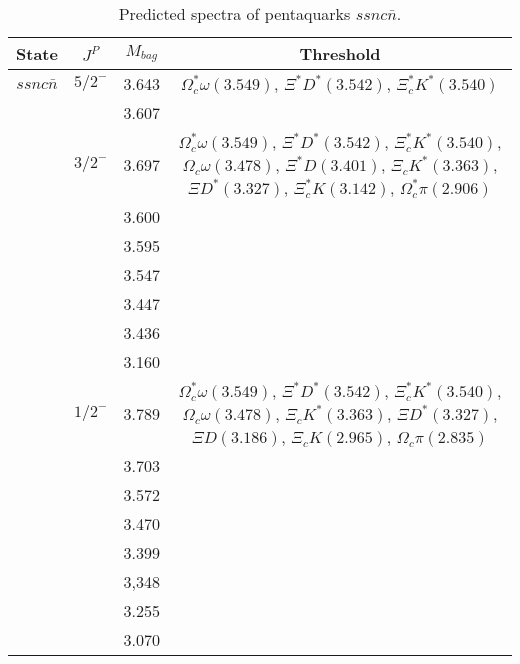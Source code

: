 \documentclass[prd,twocolumn,floatfix,nofootinbib]{revtex4}
\begin{document}
\renewcommand{\tabcolsep}{0.3cm}
\renewcommand{\arraystretch}{1.2}
\begin{table*}[!htbp]
    \caption{Predicted spectra of pentaquarks $ssnc\bar{n}$.}
    \begin{tabular}{cccc}
        \hline\hline
        {\rm State} &$J^{P}$ &$M_{bag}$ &Threshold \\ \hline
        $ssnc\bar{n}$
            &${5/2}^{-}$    &3.643  &$\Omega_{c}^{\ast}\omega(3.549)$, $\Xi^{\ast}D^{\ast}(3.542)$, $\Xi_{c}^{\ast}K^{\ast}(3.540)$ \\
            &               &3.607  & \\
            &${3/2}^{-}$    &3.697  &$\Omega_{c}^{\ast}\omega(3.549)$, $\Xi^{\ast}D^{\ast}(3.542)$, $\Xi_{c}^{\ast}K^{\ast}(3.540)$, $\Omega_{c}\omega(3.478)$, $\Xi^{\ast}D(3.401)$, $\Xi_{c}K^{\ast}(3.363)$, $\Xi D^{\ast}(3.327)$, $\Xi_{c}^{\ast}K(3.142)$, $\Omega_{c}^{\ast}\pi(2.906)$ \\
            &               &3.600  & \\
            &               &3.595  & \\
            &               &3.547  & \\
            &               &3.447  & \\
            &               &3.436  & \\
            &               &3.160  & \\
            &${1/2}^{-}$    &3.789  &$\Omega_{c}^{\ast}\omega(3.549)$, $\Xi^{\ast}D^{\ast}(3.542)$, $\Xi_{c}^{\ast}K^{\ast}(3.540)$, $\Omega_{c}\omega(3.478)$, $\Xi_{c}K^{\ast}(3.363)$, $\Xi D^{\ast}(3.327)$, $\Xi D(3.186)$, $\Xi_{c}K(2.965)$, $\Omega_{c}\pi(2.835)$ \\
            &               &3.703  & \\
            &               &3.572  & \\
            &               &3.470  & \\
            &               &3.399  & \\
            &               &3,348  & \\
            &               &3.255  & \\
            &               &3.070  & \\
        \hline\hline
    \end{tabular}
\end{table*}
\end{document}
